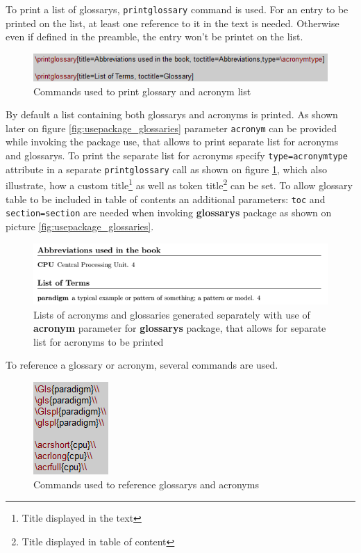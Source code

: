 To print a list of \glspl{glossary}, \texttt{\bs printglossary} command is used. For an entry to be printed on the list, at least one reference to it in the text is needed. Otherwise even if defined in the preamble, the entry won't be printet on the list.

\begin{figure}[H]
\centering
\includegraphics[scale=1.0]{content/LaTeX/figures/printglossary.png}
\caption{Commands used to print \gls{glossary} and acronym list}
\label{fig:printglossary}
\end{figure}

By default a list containing both \glspl{glossary} and acronyms is printed. As shown later on figure \ref{fig:usepackage_glossaries} \gls{parameter} \texttt{acronym} can be provided while invoking the package use, that allows to print separate list for acronyms and \glspl{glossary}. To print the separate list for acronyms specify \texttt{type=\bs acronymtype} attribute in a separate \texttt{\bs printglossary} call as shown on figure \ref{fig:printglossary}, which also illustrate, how a custom title\footnote{Title displayed in the text} as well as token title\footnote{Title displayed in table of content} can be set. To allow \gls{glossary} table to be included in table of contents an additional parameters: \texttt{toc} and \texttt{section=section} are needed when invoking \textbf{\glspl{glossary}} package as shown on picture \ref{fig:usepackage_glossaries}.

\begin{figure}[H]
\centering
\includegraphics[scale=0.8]{content/LaTeX/figures/glossary_types.png}
\caption{Lists of acronyms and glossaries generated separately with use of \textbf{acronym} parameter for \textbf{\glspl{glossary}} package, that allows for separate list for acronyms to be printed}
\end{figure}

To reference a \gls{glossary} or acronym, several commands are used.

\begin{figure}[H]
\centering
\includegraphics[scale=1.0]{content/LaTeX/figures/reference_glossaries.png}
\caption{Commands used to reference \glspl{glossary} and acronyms}
\end{figure}

